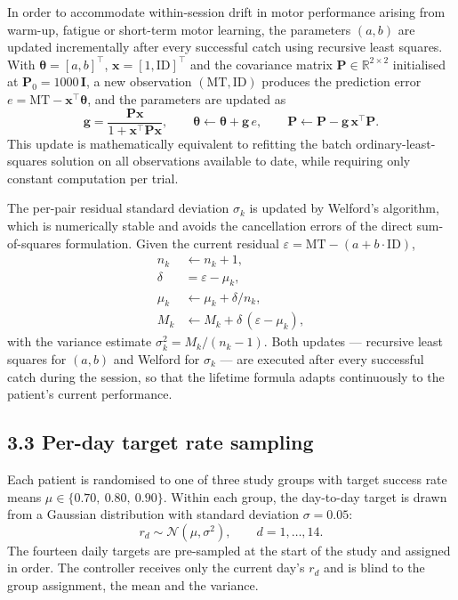 \documentclass[11pt,a4paper]{article}
\begin{document}
In order to accommodate within-session drift in motor performance arising from warm-up, fatigue or short-term motor learning, the parameters $(a, b)$ are updated incrementally after every successful catch using recursive least squares. With $\boldsymbol{\theta} = [a, b]^\top$, $\mathbf{x} = [1, \text{ID}]^\top$ and the covariance matrix $\mathbf{P} \in \mathbb{R}^{2\times 2}$ initialised at $\mathbf{P}_0 = 1000\,\mathbf{I}$, a new observation $(\text{MT}, \text{ID})$ produces the prediction error $e = \text{MT} - \mathbf{x}^\top \boldsymbol{\theta}$, and the parameters are updated as
\begin{equation}
    \mathbf{g} = \frac{\mathbf{P}\mathbf{x}}{1 + \mathbf{x}^\top \mathbf{P} \mathbf{x}}, \qquad
    \boldsymbol{\theta} \leftarrow \boldsymbol{\theta} + \mathbf{g}\,e, \qquad
    \mathbf{P} \leftarrow \mathbf{P} - \mathbf{g}\, \mathbf{x}^\top \mathbf{P}.
\end{equation}
This update is mathematically equivalent to refitting the batch ordinary-least-squares solution on all observations available to date, while requiring only constant computation per trial.

The per-pair residual standard deviation $\sigma_k$ is updated by Welford's algorithm, which is numerically stable and avoids the cancellation errors of the direct sum-of-squares formulation. Given the current residual $\varepsilon = \text{MT} - (a + b \cdot \text{ID})$,
\begin{align}
    n_k         &\leftarrow n_k + 1, \\
    \delta      &= \varepsilon - \mu_k, \\
    \mu_k       &\leftarrow \mu_k + \delta / n_k, \\
    M_k         &\leftarrow M_k + \delta\,(\varepsilon - \mu_k),
\end{align}
with the variance estimate $\sigma_k^2 = M_k / (n_k - 1)$. Both updates --- recursive least squares for $(a, b)$ and Welford for $\sigma_k$ --- are executed after every successful catch during the session, so that the lifetime formula adapts continuously to the patient's current performance.

\subsection*{3.3 Per-day target rate sampling}

Each patient is randomised to one of three study groups with target success rate means $\mu \in \{0.70,\ 0.80,\ 0.90\}$. Within each group, the day-to-day target is drawn from a Gaussian distribution with standard deviation $\sigma = 0.05$:
\begin{equation}
    r_d \sim \mathcal{N}(\mu, \sigma^2), \qquad d = 1, \ldots, 14.
\end{equation}
The fourteen daily targets are pre-sampled at the start of the study and assigned in order. The controller receives only the current day's $r_d$ and is blind to the group assignment, the mean and the variance.
\end{document}

